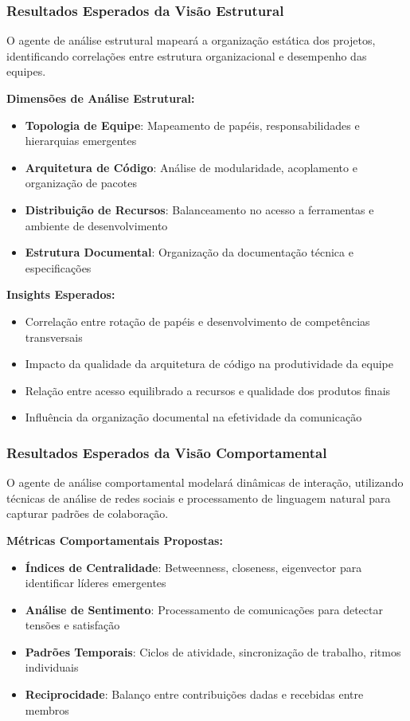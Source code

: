 \documentclass[english, spanish, brazilian]{modelo_dt}
\begin{document}
\subsubsection{Resultados Esperados da Visão Estrutural}

O agente de análise estrutural mapeará a organização estática dos projetos, identificando correlações entre estrutura organizacional e desempenho das equipes.

\textbf{Dimensões de Análise Estrutural:}
\begin{itemize}
\item \textbf{Topologia de Equipe}: Mapeamento de papéis, responsabilidades e hierarquias emergentes
\item \textbf{Arquitetura de Código}: Análise de modularidade, acoplamento e organização de pacotes
\item \textbf{Distribuição de Recursos}: Balanceamento no acesso a ferramentas e ambiente de desenvolvimento
\item \textbf{Estrutura Documental}: Organização da documentação técnica e especificações
\end{itemize}

\textbf{Insights Esperados:}
\begin{itemize}
\item Correlação entre rotação de papéis e desenvolvimento de competências transversais
\item Impacto da qualidade da arquitetura de código na produtividade da equipe
\item Relação entre acesso equilibrado a recursos e qualidade dos produtos finais
\item Influência da organização documental na efetividade da comunicação
\end{itemize}

\subsubsection{Resultados Esperados da Visão Comportamental}

O agente de análise comportamental modelará dinâmicas de interação, utilizando técnicas de análise de redes sociais e processamento de linguagem natural para capturar padrões de colaboração.

\textbf{Métricas Comportamentais Propostas:}
\begin{itemize}
\item \textbf{Índices de Centralidade}: Betweenness, closeness, eigenvector para identificar líderes emergentes
\item \textbf{Análise de Sentimento}: Processamento de comunicações para detectar tensões e satisfação
\item \textbf{Padrões Temporais}: Ciclos de atividade, sincronização de trabalho, ritmos individuais
\item \textbf{Reciprocidade}: Balanço entre contribuições dadas e recebidas entre membros
\end{itemize}
\end{document}
